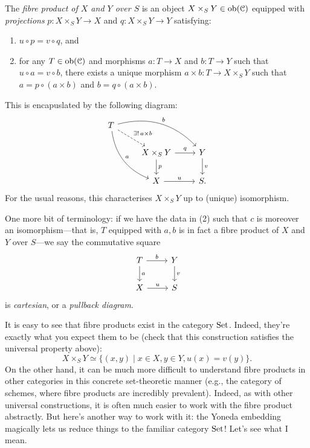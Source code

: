 \begin{definition}
The \textit{fibre product of $X$ and $Y$ over $S$} is an object $X
\times_S Y \in \operatorname{ob}(\mathcal{C})$ equipped with \textit{projections} $p : X
\times_S Y \to X$ and $q : X \times_S Y \to Y$ satisfying:
\begin{enumerate}
\item $u \circ p = v \circ q$, and
\item for any $T \in \operatorname{ob}(\mathcal{C})$ and morphisms $a : T \to X$ and $b : T
  \to Y$ such that $u \circ a = v \circ b$, there exists a unique
  morphism $a \times b : T \to X \times_S Y$ such that $a = p \circ (a
  \times b)$ and $b = q \circ (a \times b)$.
\end{enumerate}
This is encapuslated by the following diagram:
\[
\begin{tikzcd}
  T \ar[bend left]{rrd}{b} \ar[bend right]{ddr}{a}
  \ar[dashed]{dr}{\exists!\, a \times b} & & \\ & X \times_S Y \rar{q}
  \dar{p} & Y \dar{v} \\ & X \rar{u} & S.
\end{tikzcd}
\]
For the usual reasons, this characterises $X \times_S Y$ up to
(unique) isomorphism.

One more bit of terminology: if we have the data in (2) such that $c$
is moreover an isomorphism---that is, $T$ equipped with $a,b$ is in
fact a fibre product of $X$ and $Y$ over $S$---we say the commutative
square
\[
\begin{tikzcd}
  T \rar{b} \dar{a} & Y \dar{v} \\ X \rar{u} & S
\end{tikzcd}
\]
is \textit{cartesian}, or a \textit{pullback diagram}.
\end{definition}

\begin{example}
  It is easy to see that fibre products exist in the category
  $\mathrm{Set}$. Indeed, they're exactly what you expect them to be (check
  that this construction satisfies the universal property above):
  \[
  X \times_S Y \simeq \{(x, y) \mid x \in X, y \in Y, u(x) = v(y)\}.
  \]
  On the other hand, it can be much more difficult to understand fibre
  products in other categories in this concrete set-theoretic manner
  (e.g., the category of schemes, where fibre products are incredibly
  prevalent). Indeed, as with other universal constructions, it is
  often much easier to work with the fibre product abstractly. But
  here's another way to work with it: the Yoneda embedding magically
  lets us reduce things to the familiar category $\mathrm{Set}$!  Let's see
  what I mean.
\end{example}


